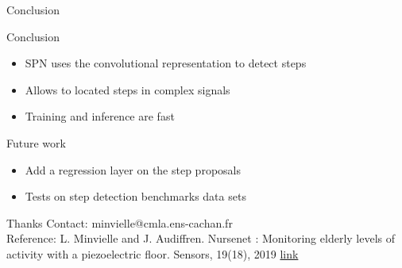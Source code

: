 \begin{frame}{Conclusion}

\centering
\begin{minipage}[t]{0.8\linewidth}
Conclusion
\begin{itemize}
    \item SPN uses the convolutional representation to detect steps
    \item Allows to located steps in complex signals
    \item Training and inference are fast
\end{itemize}
Future work
\begin{itemize}
    \item Add a regression layer on the step proposals
    \item Tests on step detection benchmarks data sets
\end{itemize}
\end{minipage}

\vfill
\pause
\begin{block}{\centering Thanks}
\medskip
Contact: minvielle@cmla.ens-cachan.fr\\[5pt]
Reference: L. Minvielle and J. Audiffren. Nursenet : Monitoring elderly levels of activity with a
piezoelectric floor. Sensors, 19(18), 2019
\; \href{https://www.mdpi.com/1424-8220/19/18/3851}{{ link}}
\end{block}
\end{frame}
